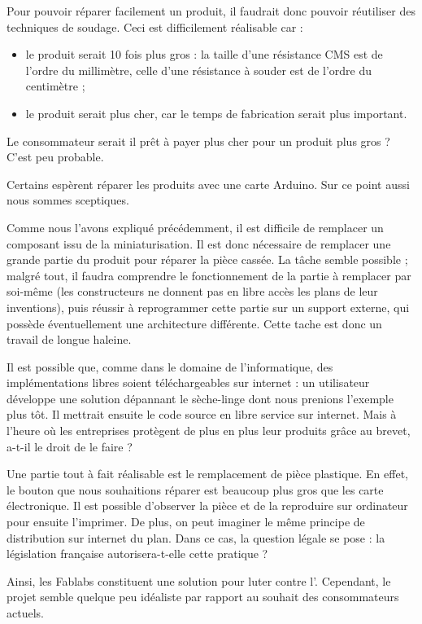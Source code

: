 Pour pouvoir  réparer facilement un produit, il faudrait donc pouvoir réutiliser des techniques de soudage. Ceci est difficilement réalisable car : 
\begin{itemize}
\item le produit serait 10 fois plus gros : la taille d'une résistance CMS est de l'ordre du millimètre, celle d'une résistance à souder est de l'ordre du centimètre ;
\item le produit serait plus cher, car le temps de fabrication serait plus important.
\end{itemize}
Le consommateur serait il prêt à payer plus cher pour un produit plus gros ? C'est peu probable.

\medbreak
Certains espèrent réparer les produits avec une carte Arduino. Sur ce point aussi nous sommes sceptiques. 

Comme nous l'avons expliqué précédemment, il est difficile de remplacer un composant issu de la miniaturisation. Il est donc nécessaire de remplacer une grande partie du produit pour réparer la pièce cassée. La tâche semble possible ; malgré tout, il faudra comprendre le fonctionnement de la partie à remplacer par soi-même (les constructeurs ne donnent pas en libre accès les plans de leur inventions), puis réussir à reprogrammer cette partie sur un support externe, qui possède éventuellement une architecture différente. Cette tache est donc un travail de longue haleine. 

Il est possible que, comme dans le domaine de l'informatique, des implémentations libres soient téléchargeables sur internet : un utilisateur développe une solution dépannant le sèche-linge dont nous prenions l'exemple plus tôt. Il mettrait ensuite le code source en libre service sur internet. Mais à l'heure où les entreprises protègent de plus en plus leur produits grâce au brevet, a-t-il le droit de le faire ? 

\medbreak
Une partie tout à fait réalisable est le remplacement de pièce plastique. En effet, le bouton que nous souhaitions réparer est beaucoup plus gros que les carte électronique. Il est possible d'observer la pièce et de la reproduire sur ordinateur pour ensuite l'imprimer. De plus, on peut imaginer le même principe de distribution sur internet du plan. Dans ce cas, la question légale se pose : la législation française autorisera-t-elle cette pratique ? 

\bigbreak
Ainsi, les Fablabs constituent une solution pour luter contre l'\op. Cependant, le projet semble quelque peu idéaliste par rapport au souhait des consommateurs actuels. 
